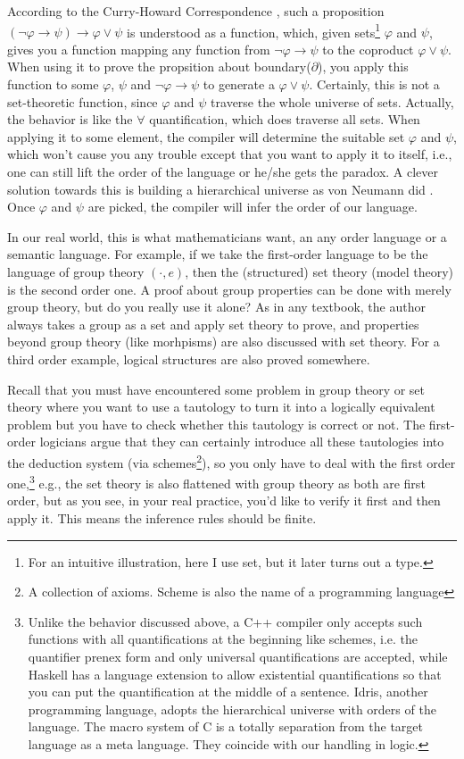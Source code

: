 According to the Curry-Howard 
Correspondence \cite{Curry-Howard,Curry-Howard-Scheme}, such a
proposition $(\neg\varphi\to\psi)\to\varphi\vee\psi$ is understood as a 
function, which, given sets\footnote{For an intuitive illustration, 
here I use set, but it later turns out a type.} $\varphi$ and $\psi$, 
gives you a function mapping any function from 
$\neg\varphi\to\psi$ to the coproduct $\varphi\vee\psi$. When using it to
prove the propsition about boundary($\partial$), you apply this
function to some $\varphi$, $\psi$ and $\neg\varphi\to\psi$ to generate
a $\varphi\vee\psi$. Certainly, this is not a set-theoretic function,
since $\varphi$ and $\psi$ traverse the whole universe of sets. Actually,
the behavior is like the $\forall$ quantification, which does traverse
all sets. When applying it to some element, the compiler will determine
the suitable set $\varphi$ and $\psi$, which won't cause you any trouble
except that you want to apply it to itself, i.e., one can still lift
the order of the language or he/she gets the paradox. A clever solution 
towards this is building a hierarchical universe as von Neumann did 
\cite{von-Neumann-universe}. Once $\varphi$ and $\psi$ are picked, the 
compiler will infer the order of our language. 

In our real world, this is what mathematicians want, an any order
language or a semantic language. For example, if we take the 
first-order language to be the language of group theory $(\cdot,e)$, 
then the (structured) set theory (model theory) is the second order one.
A proof about group properties can be done with merely group theory,
but do you really use it alone? As in any textbook, the author always
takes a group as a set and apply set theory to prove, and properties
beyond group theory (like morhpisms) are also discussed with set
theory. For a third order example, logical structures are also proved
somewhere. 

Recall that you must have encountered some problem in
group theory or set theory where you want to use a tautology to turn 
it into a logically equivalent problem but you have to check whether 
this tautology is correct or not. The first-order logicians argue that 
they can certainly introduce all these tautologies
into the deduction system (via schemes\footnote{A collection of
axioms. Scheme is also the name of a programming language}), so you 
only have to deal with the first order one,\footnote{Unlike the behavior 
discussed above, a C++ compiler only accepts such functions with all 
quantifications at the beginning like schemes, i.e. the quantifier 
prenex form and only universal quantifications are accepted, while 
Haskell has a language extension to allow existential quantifications 
so that you can put the quantification at the middle of a sentence.
Idris, another programming language, adopts the hierarchical universe
with orders of the language. The macro system of C is a totally 
separation from the target language as a meta language. They coincide
with our handling in logic.} e.g., the set theory is also flattened with
group theory as both are first order, but as you see, in your real 
practice, you'd like to verify it first and then apply it. This means
the inference rules should be finite. 


